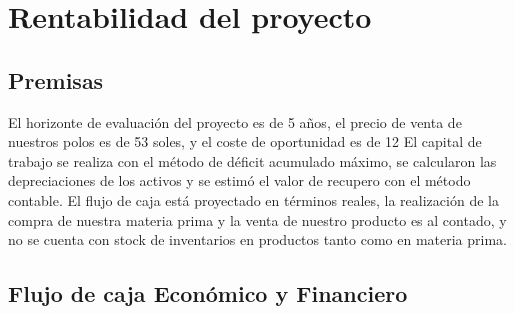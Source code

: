 \documentclass[a4paper,openright,12pt]{book}
\begin{document}
\chapter{Rentabilidad del proyecto}\label{cap.5}

\section{Premisas}

El horizonte de evaluación del proyecto es de 5 años, el precio de venta de nuestros polos es de 53 soles, y el coste de oportunidad es de 12%
El capital de trabajo se realiza con el método de déficit acumulado máximo, se calcularon las depreciaciones de los activos y se estimó el valor de recupero con el método contable. El flujo de caja está proyectado en términos reales, la realización de la compra de nuestra materia prima y la venta de nuestro producto es al contado, y no se cuenta con stock de inventarios en productos tanto como en materia prima.


\section{Flujo de caja Económico y Financiero}
\end{document}
